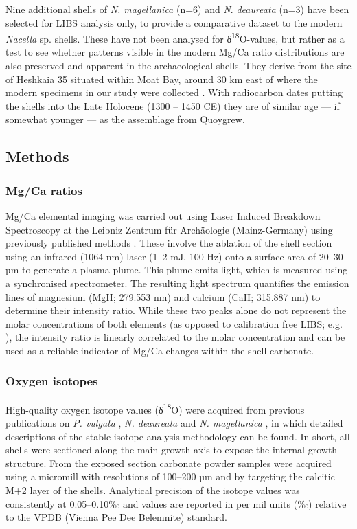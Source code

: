 \documentclass[
  authoryear,
  preprint,
  3p]{elsarticle}
\begin{document}
Nine additional shells of \emph{N. magellanica} (n=6) and \emph{N}.
\emph{deaureata} (n=3) have been selected for LIBS analysis only, to
provide a comparative dataset to the modern \emph{Nacella} sp. shells.
These have not been analysed for δ\textsuperscript{18}O-values, but
rather as a test to see whether patterns visible in the modern Mg/Ca
ratio distributions are also preserved and apparent in the
archaeological shells. They derive from the site of Heshkaia 35 situated
within Moat Bay, around 30 km east of where the modern specimens in our
study were collected \citep{Zangrando2014-qi, Zangrando2021-qg}. With
radiocarbon dates putting the shells into the Late Holocene (1300 --
1450 CE) they are of similar age --- if somewhat younger --- as the
assemblage from Quoygrew.

\subsection{Methods}\label{methods}

\subsubsection{Mg/Ca ratios}\label{mgca-ratios}

Mg/Ca elemental imaging was carried out using Laser Induced Breakdown
Spectroscopy at the Leibniz Zentrum für Archäologie (Mainz-Germany)
using previously published methods \citep{Hausmann2023-ih}. These
involve the ablation of the shell section using an infrared (1064 nm)
laser (1--2 mJ, 100 Hz) onto a surface area of 20--30 µm to generate a
plasma plume. This plume emits light, which is measured using a
synchronised spectrometer. The resulting light spectrum quantifies the
emission lines of magnesium (MgII; 279.553 nm) and calcium (CaII;
315.887 nm) to determine their intensity ratio. While these two peaks
alone do not represent the molar concentrations of both elements (as
opposed to calibration free LIBS; e.g.
\citep{Martinez-Minchero2022-jz}), the intensity ratio is linearly
correlated to the molar concentration \citep{Hausmann2017-oa} and can be
used as a reliable indicator of Mg/Ca changes within the shell
carbonate.

\subsubsection{Oxygen isotopes}\label{oxygen-isotopes}

High-quality oxygen isotope values (δ\textsuperscript{18}O) were
acquired from previous publications on \emph{P. vulgata}
\citep{Surge2012-ba, Graniero2017-io}, \emph{N. deaureata} and \emph{N.
magellanica} \citep{Nicastro2020-ih}, in which detailed descriptions of
the stable isotope analysis methodology can be found. In short, all
shells were sectioned along the main growth axis to expose the internal
growth structure. From the exposed section carbonate powder samples were
acquired using a micromill with resolutions of 100--200 µm and by
targeting the calcitic M+2 layer of the shells. Analytical precision of
the isotope values was consistently at 0.05--0.10‰ and values are
reported in per mil units (‰) relative to the VPDB (Vienna Pee Dee
Belemnite) standard.
\end{document}
